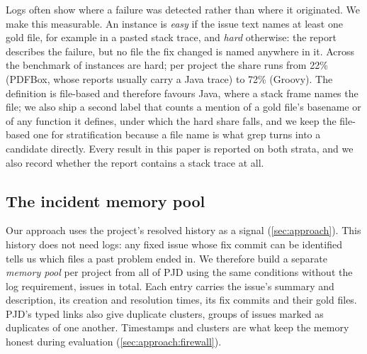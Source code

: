 Logs often show where a failure was detected rather than where it
originated. We make this measurable. An instance
is \emph{easy} if the issue text names at least one gold file, for
example in a pasted stack trace, and \emph{hard} otherwise: the report
describes the failure, but no file the fix changed is named anywhere in
it. Across the benchmark \nHardPct{} of instances are hard; per project
the share runs from 22\% (PDFBox, whose reports usually carry a Java
trace) to 72\% (Groovy). The definition is file-based and therefore
favours Java, where a stack frame names the file; we also ship a second
label that counts a mention of a gold file's basename or of any function
it defines, under which the hard share falls, and we keep the file-based
one for stratification because a file name is what grep turns into a
candidate directly. Every result in this paper is reported on both
strata, and we also record whether the report contains a stack trace at
all.

\subsection{The incident memory pool}
\label{sec:benchmark:memory}

Our approach uses the project's resolved history as a signal
(\cref{sec:approach}). This history does not need logs: any fixed issue
whose fix commit can be identified tells us which files a past problem
ended in. We therefore build a separate \emph{memory pool} per project
from all of PJD using the same conditions without the log requirement,
\nMemoryPool{} issues in total. Each entry carries the issue's summary
and description, its creation and resolution times, its fix commits and
their gold files. PJD's typed links also give duplicate clusters,
groups of issues marked as duplicates of one another. Timestamps and
clusters are what keep the memory honest during evaluation
(\cref{sec:approach:firewall}).

